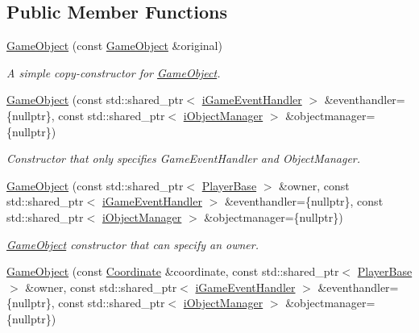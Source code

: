 \subsection*{Public Member Functions}
\begin{DoxyCompactItemize}
\item 
\hyperlink{classCourse_1_1GameObject_ad250968a18df7c5de3ac55a72a3a0326}{Game\-Object} (const \hyperlink{classCourse_1_1GameObject}{Game\-Object} \&original)
\begin{DoxyCompactList}\small\item\em A simple copy-\/constructor for \hyperlink{classCourse_1_1GameObject}{Game\-Object}. \end{DoxyCompactList}\item 
\hyperlink{classCourse_1_1GameObject_a4eeabd6bdee20a60dc091fde67340cde}{Game\-Object} (const std\-::shared\-\_\-ptr$<$ \hyperlink{classCourse_1_1iGameEventHandler}{i\-Game\-Event\-Handler} $>$ \&eventhandler=\{nullptr\}, const std\-::shared\-\_\-ptr$<$ \hyperlink{classCourse_1_1iObjectManager}{i\-Object\-Manager} $>$ \&objectmanager=\{nullptr\})
\begin{DoxyCompactList}\small\item\em Constructor that only specifies Game\-Event\-Handler and Object\-Manager. \end{DoxyCompactList}\item 
\hyperlink{classCourse_1_1GameObject_a3daab55fb0f661324883acceaee817d0}{Game\-Object} (const std\-::shared\-\_\-ptr$<$ \hyperlink{classCourse_1_1PlayerBase}{Player\-Base} $>$ \&owner, const std\-::shared\-\_\-ptr$<$ \hyperlink{classCourse_1_1iGameEventHandler}{i\-Game\-Event\-Handler} $>$ \&eventhandler=\{nullptr\}, const std\-::shared\-\_\-ptr$<$ \hyperlink{classCourse_1_1iObjectManager}{i\-Object\-Manager} $>$ \&objectmanager=\{nullptr\})
\begin{DoxyCompactList}\small\item\em \hyperlink{classCourse_1_1GameObject}{Game\-Object} constructor that can specify an owner. \end{DoxyCompactList}\item 
\hyperlink{classCourse_1_1GameObject_a2b5425b9b112077d35b576031dc8bf74}{Game\-Object} (const \hyperlink{classCourse_1_1Coordinate}{Coordinate} \&coordinate, const std\-::shared\-\_\-ptr$<$ \hyperlink{classCourse_1_1PlayerBase}{Player\-Base} $>$ \&owner, const std\-::shared\-\_\-ptr$<$ \hyperlink{classCourse_1_1iGameEventHandler}{i\-Game\-Event\-Handler} $>$ \&eventhandler=\{nullptr\}, const std\-::shared\-\_\-ptr$<$ \hyperlink{classCourse_1_1iObjectManager}{i\-Object\-Manager} $>$ \&objectmanager=\{nullptr\})

\end{DoxyCompactItemize}
